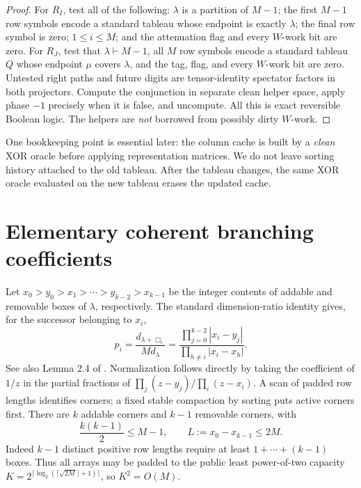 \documentclass[11pt]{article}
\theoremstyle{definition}
\begin{document}
\begin{proof}
For $R_I$, test all of the following: $\lambda$ is a partition of $M-1$;
the first $M-1$ row symbols encode a standard tableau whose endpoint is
exactly $\lambda$; the final row symbol is zero; $1\le i\le M$; and the
attenuation flag and every $W$-work bit are zero. For $R_J$, test that
$\lambda\vdash M-1$, all $M$ row symbols encode a standard tableau $Q$
whose endpoint $\mu$ covers $\lambda$, and the tag, flag, and every
$W$-work bit are zero. Untested right paths and future digits are
tensor-identity spectator factors in both projectors.
Compute the conjunction in
separate clean helper space, apply phase $-1$ precisely when it is false,
and uncompute. All this is exact reversible Boolean logic. The helpers
are \emph{not} borrowed from possibly dirty $W$-work.
\end{proof}

One bookkeeping point is essential later: the column cache is built by a
\emph{clean} XOR oracle before applying representation matrices. We do not
leave sorting history attached to the old tableau. After the tableau
changes, the same XOR oracle evaluated on the new tableau erases the
updated cache.

\section{Elementary coherent branching coefficients}\label{sec:weights}

Let $x_0>y_0>x_1>\cdots>y_{k-2}>x_{k-1}$ be the integer contents of
addable and removable boxes of $\lambda$, respectively. The standard
dimension-ratio identity gives, for the successor belonging to $x_i$,
\begin{equation}\label{eq:residue}
 p_i=\frac{d_{\lambda+\Box_i}}{M d_\lambda}
 =\frac{\prod_{j=0}^{k-2}|x_i-y_j|}{\prod_{h\ne i}|x_i-x_h|}.
\end{equation}
See also Lemma 2.4 of \cite{bgo}. Normalization follows directly by taking
the coefficient of $1/z$ in the partial fractions of
$\prod_j(z-y_j)/\prod_i(z-x_i)$. A scan of padded row lengths identifies
corners; a fixed stable compaction by sorting puts active corners first.
There are $k$ addable corners and $k-1$ removable corners, with
\[
 \frac{k(k-1)}2\le M-1,\qquad L:=x_0-x_{k-1}\le2M.
\]
Indeed $k-1$ distinct positive row lengths require at least
$1+\cdots+(k-1)$ boxes. Thus all arrays may be padded to the public
least power-of-two capacity
$K=2^{\lceil\log_2(\lceil\sqrt{2M}\rceil+1)\rceil}$, so $K^2=O(M)$.
\end{document}
